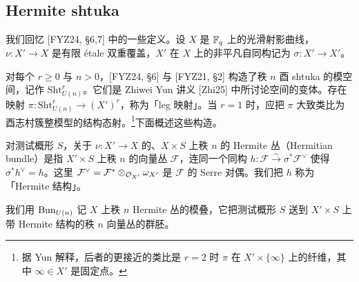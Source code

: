 \subsection{Hermite shtuka}

我们回忆 [FYZ24, §6,7] 中的一些定义。设 $X$ 是 $\mathbb{F}_q$ 上的光滑射影曲线，$\nu\colon X'\to X$ 是有限 étale 双重覆盖，$X'$ 在 $X$ 上的非平凡自同构记为 $\sigma\colon X'\to X'$。

对每个 $r\ge0$ 与 $n>0$，[FYZ24, §6] 与 [FYZ21, §2] 构造了秩 $n$ 酉 shtuka 的模空间，记作 $\mathrm{Sht}^r_{U(n)}$。它们是 Zhiwei Yun 讲义 [Zhi25] 中所讨论空间的变体。存在映射 $\pi\colon\mathrm{Sht}^r_{U(n)}\to(X')^r$，称为「leg 映射」。当 $r=1$ 时，应把 $\pi$ 大致类比为酉志村簇整模型的结构态射。\footnote{据 Yun 解释，后者的更接近的类比是 $r=2$ 时 $\pi$ 在 $X'\times\{\infty\}$ 上的纤维，其中 $\infty\in X'$ 是固定点。}下面概述这些构造。

对测试概形 $S$，关于 $\nu\colon X'\to X$ 的、$X\times S$ 上秩 $n$ 的 Hermite 丛（Hermitian bundle）是指 $X'\times S$ 上秩 $n$ 的向量丛 $\mathcal F$，连同一个同构 $h\colon\mathcal F\xrightarrow{\sim}\sigma^*\mathcal F^\vee$ 使得 $\sigma^*h^\vee=h$。这里 $\mathcal F^\vee=\mathcal F^*\otimes_{\mathcal{O}_{X'}}\omega_{X'}$ 是 $\mathcal F$ 的 Serre 对偶。我们把 $h$ 称为「Hermite 结构」。

我们用 $\operatorname{Bun}_{U(n)}$ 记 $X$ 上秩 $n$ Hermite 丛的模叠，它把测试概形 $S$ 送到 $X'\times S$ 上带 Hermite 结构的秩 $n$ 向量丛的群胚。

